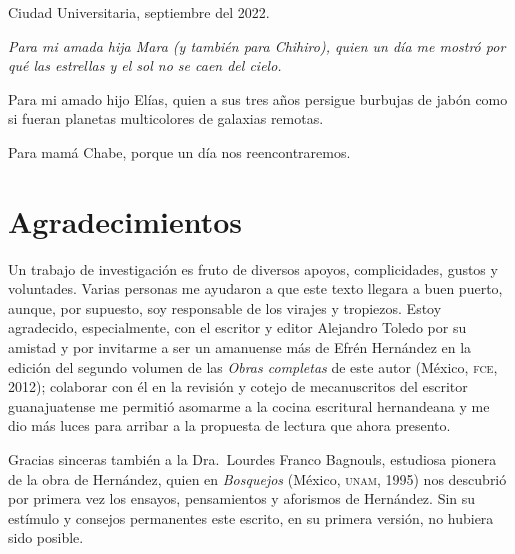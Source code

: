 \documentclass[14pt,twoside,final]{extbook} %
\begin{document}
\vfill
\begin{center}
\large Ciudad Universitaria, septiembre del 2022.
\end{center}
\newpage
\pagestyle{empty}
\null\vfill
\newpage
\pagestyle{empty}
\vspace*{42pt}
\begin{flushright}
\begin{minipage}{7.5cm}
\em Para mi amada hija Mara (y también para Chihiro), quien un día me mostró por qué las estrellas y el sol no se caen del cielo.
\begin{center}
\end{center}
Para mi amado hijo Elías, quien a sus tres años persigue burbujas de jabón como si fueran planetas multicolores de galaxias remotas.
\begin{center}
\end{center}
Para mamá Chabe, porque un día nos reencontraremos.
\end{minipage}
\end{flushright}
\newpage
\pagestyle{empty}
\null\vfill
\chapter*{Agradecimientos}\label{ch:agradecimientos}
\thispagestyle{empty}
\pagestyle{fancy}
\fancyhf{} %
\fancyhead[LE,RO]{\thepage}
\renewcommand{\headrulewidth}{0pt}
\setcounter{page}{5}
Un trabajo de investigación es fruto de diversos apoyos, complicidades, gustos y voluntades. Varias personas me ayudaron a que este texto llegara a buen puerto, aunque, por supuesto, soy responsable de los virajes y tropiezos. Estoy agradecido, especialmente, con el escritor y editor Alejandro Toledo por su amistad y por invitarme a ser un amanuense más de Efrén Hernández en la edición del segundo volumen de las \emph{Obras completas} de este autor (México, \textsc{fce}, 2012); colaborar con él en la revisión y cotejo de mecanuscritos del escritor guanajuatense me permitió asomarme a la cocina escritural hernandeana y me dio más luces para arribar a la propuesta de lectura que ahora presento.

Gracias sinceras también a la Dra.~Lourdes Franco Bagnouls, estudiosa pionera de la obra de Hernández, quien en \emph{Bosquejos} (México, \textsc{unam}, 1995) nos descubrió por primera vez los ensayos, pensamientos y aforismos de Hernández. Sin su estímulo y consejos permanentes este escrito, en su primera versión, no hubiera sido posible.
\end{document}
